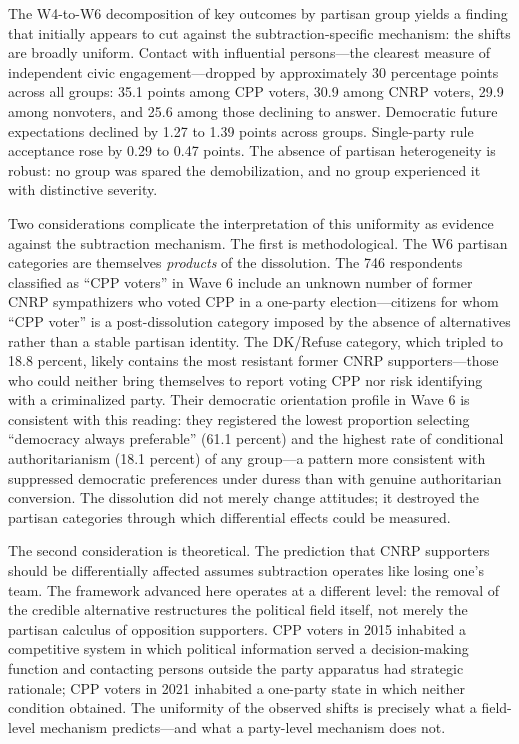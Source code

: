 \documentclass[
  12pt,
  letterpaper]{article}
\begin{document}
The W4-to-W6 decomposition of key outcomes by partisan group yields a
finding that initially appears to cut against the subtraction-specific
mechanism: the shifts are broadly uniform. Contact with influential
persons---the clearest measure of independent civic engagement---dropped
by approximately 30 percentage points across all groups: 35.1 points
among CPP voters, 30.9 among CNRP voters, 29.9 among nonvoters, and 25.6
among those declining to answer. Democratic future expectations declined
by 1.27 to 1.39 points across groups. Single-party rule acceptance rose
by 0.29 to 0.47 points. The absence of partisan heterogeneity is robust:
no group was spared the demobilization, and no group experienced it with
distinctive severity.

Two considerations complicate the interpretation of this uniformity as
evidence against the subtraction mechanism. The first is methodological.
The W6 partisan categories are themselves \emph{products} of the
dissolution. The 746 respondents classified as ``CPP voters'' in Wave 6
include an unknown number of former CNRP sympathizers who voted CPP in a
one-party election---citizens for whom ``CPP voter'' is a
post-dissolution category imposed by the absence of alternatives rather
than a stable partisan identity. The DK/Refuse category, which tripled
to 18.8 percent, likely contains the most resistant former CNRP
supporters---those who could neither bring themselves to report voting
CPP nor risk identifying with a criminalized party. Their democratic
orientation profile in Wave 6 is consistent with this reading: they
registered the lowest proportion selecting ``democracy always
preferable'' (61.1 percent) and the highest rate of conditional
authoritarianism (18.1 percent) of any group---a pattern more consistent
with suppressed democratic preferences under duress than with genuine
authoritarian conversion. The dissolution did not merely change
attitudes; it destroyed the partisan categories through which
differential effects could be measured.

The second consideration is theoretical. The prediction that CNRP
supporters should be differentially affected assumes subtraction
operates like losing one's team. The framework advanced here operates at
a different level: the removal of the credible alternative restructures
the political field itself, not merely the partisan calculus of
opposition supporters. CPP voters in 2015 inhabited a competitive system
in which political information served a decision-making function and
contacting persons outside the party apparatus had strategic rationale;
CPP voters in 2021 inhabited a one-party state in which neither
condition obtained. The uniformity of the observed shifts is precisely
what a field-level mechanism predicts---and what a party-level mechanism
does not.
\end{document}
